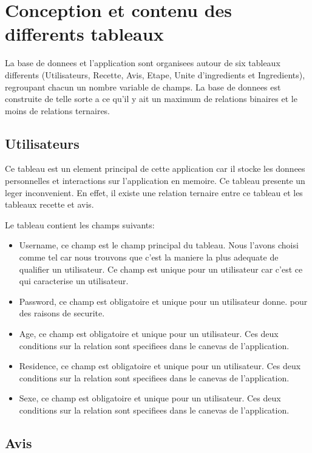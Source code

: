 \documentclass[a4paper,10pt]{report}
\begin{document}
\pagebreak

\chapter{Conception et contenu des differents tableaux}

La base de donnees et l'application sont organisees autour de six tableaux differents (Utilisateurs, Recette, Avis, Etape, Unite d'ingredients et Ingredients), regroupant chacun un nombre variable de champs.  La base de donnees est construite de telle sorte a ce qu'il y ait un maximum de relations binaires et le moins de relations ternaires.

\section{Utilisateurs}

Ce tableau est un element principal de cette application car il stocke les donnees personnelles et interactions sur l'application en memoire. Ce tableau presente un leger inconvenient. En effet, il existe une relation ternaire entre ce tableau et les tableaux recette et avis.

Le tableau contient les champs suivants:
\begin{itemize}
	\item Username, ce champ est le champ principal du tableau. Nous l'avons choisi comme tel car nous trouvons que c'est la maniere la plus adequate de qualifier un utilisateur. Ce champ est unique pour un utilisateur car c'est ce qui caracterise un utilisateur.
	\item Password, ce champ est obligatoire et unique pour un utilisateur donne. pour des raisons de securite.
	\item Age, ce champ est obligatoire et unique pour un utilisateur. Ces deux conditions sur la relation sont specifiees dans le canevas de l'application.
	\item Residence, ce champ est obligatoire et unique pour un utilisateur. Ces deux conditions sur la relation sont specifiees dans le canevas de l'application.
	\item Sexe, ce champ est obligatoire et unique pour un utilisateur. Ces deux conditions sur la relation sont specifiees dans le canevas de l'application.
	\end{itemize}
\section{Avis}
\end{document}

